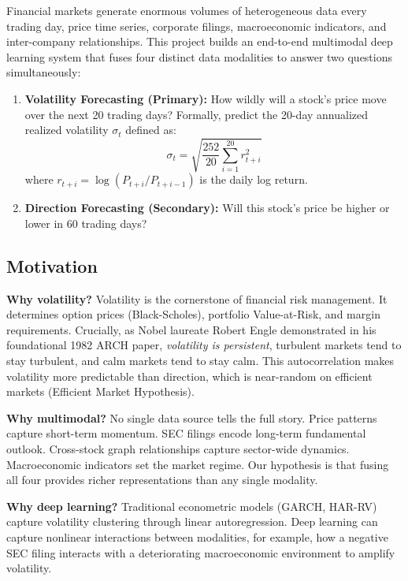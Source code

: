 \documentclass[12pt,a4paper]{article}
\begin{document}
Financial markets generate enormous volumes of heterogeneous data every trading day, price time series, corporate filings, macroeconomic indicators, and inter-company relationships. This project builds an end-to-end multimodal deep learning system that fuses four distinct data modalities to answer two questions simultaneously:

\begin{enumerate}
    \item \textbf{Volatility Forecasting (Primary):} How wildly will a stock's price move over the next 20 trading days? Formally, predict the 20-day annualized realized volatility $\sigma_t$ defined as:
    \begin{equation}
        \sigma_t = \sqrt{\frac{252}{20} \sum_{i=1}^{20} r_{t+i}^2}
    \end{equation}
    where $r_{t+i} = \log(P_{t+i}/P_{t+i-1})$ is the daily log return.

    \item \textbf{Direction Forecasting (Secondary):} Will this stock's price be higher or lower in 60 trading days?
\end{enumerate}

\subsection{Motivation}

\textbf{Why volatility?} Volatility is the cornerstone of financial risk management. It determines option prices (Black-Scholes), portfolio Value-at-Risk, and margin requirements. Crucially, as Nobel laureate Robert Engle demonstrated in his foundational 1982 ARCH paper, \textit{volatility is persistent}, turbulent markets tend to stay turbulent, and calm markets tend to stay calm. This autocorrelation makes volatility more predictable than direction, which is near-random on efficient markets (Efficient Market Hypothesis).

\textbf{Why multimodal?} No single data source tells the full story. Price patterns capture short-term momentum. SEC filings encode long-term fundamental outlook. Cross-stock graph relationships capture sector-wide dynamics. Macroeconomic indicators set the market regime. Our hypothesis is that fusing all four provides richer representations than any single modality.

\textbf{Why deep learning?} Traditional econometric models (GARCH, HAR-RV) capture volatility clustering through linear autoregression. Deep learning can capture nonlinear interactions between modalities, for example, how a negative SEC filing interacts with a deteriorating macroeconomic environment to amplify volatility.
\end{document}
